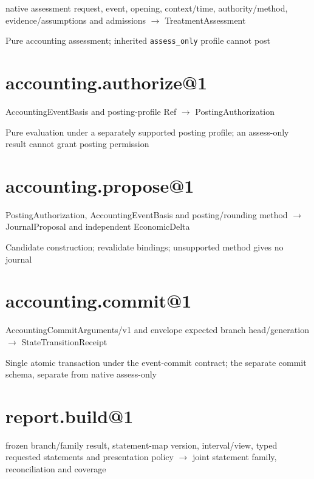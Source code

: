 native assessment request, event, opening, context/time, authority/method, evidence/assumptions and admissions \ensuremath{\rightarrow} TreatmentAssessment

Pure accounting assessment; inherited \texttt{assess\_only} profile cannot post

\hypertarget{accounting.authorize1}{%
\section{accounting.authorize@1}\label{accounting.authorize1}}

AccountingEventBasis and posting-profile Ref \ensuremath{\rightarrow} PostingAuthorization

Pure evaluation under a separately supported posting profile; an assess-only result cannot grant posting permission

\hypertarget{accounting.propose1}{%
\section{accounting.propose@1}\label{accounting.propose1}}

PostingAuthorization, AccountingEventBasis and posting/rounding method \ensuremath{\rightarrow} JournalProposal and independent EconomicDelta

Candidate construction; revalidate bindings; unsupported method gives no journal

\hypertarget{accounting.commit1}{%
\section{accounting.commit@1}\label{accounting.commit1}}

AccountingCommitArguments/v1 and envelope expected branch head/generation \ensuremath{\rightarrow} StateTransitionReceipt

Single atomic transaction under the event-commit contract; the separate commit schema, separate from native assess-only

\hypertarget{report.build1}{%
\section{report.build@1}\label{report.build1}}

frozen branch/family result, statement-map version, interval/view, typed requested statements and presentation policy \ensuremath{\rightarrow} joint statement family, reconciliation and coverage

